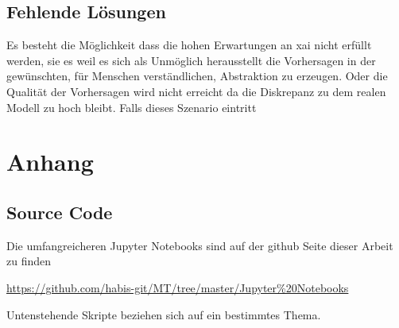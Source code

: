 \documentclass[
  12pt, %
  a4paper, %
  oneside, %
  openany, 
  numbers=noenddot, %
  BCOR=5mm, %
  parskip=half*, %
  thesis, %
]{bfhbook}
\begin{document}
\section{Fehlende Lösungen}
Es besteht die Möglichkeit dass die hohen Erwartungen an \Gls{xai} nicht erfüllt werden, sie es weil es sich als Unmöglich herausstellt die Vorhersagen in der gewünschten, für Menschen verständlichen, Abstraktion zu erzeugen. Oder die Qualität der Vorhersagen wird nicht erreicht da die Diskrepanz zu dem realen Modell zu hoch bleibt. Falls dieses Szenario eintritt 
\parencite{Rudin2018}

\chapter{Anhang}
\section*{Source Code}
\label{dt-vis}

Die umfangreicheren Jupyter Notebooks sind auf der github Seite dieser Arbeit zu finden 

\url{https://github.com/habis-git/MT/tree/master/Jupyter\%20Notebooks}


Untenstehende Skripte beziehen sich auf ein bestimmtes Thema.
\end{document}
